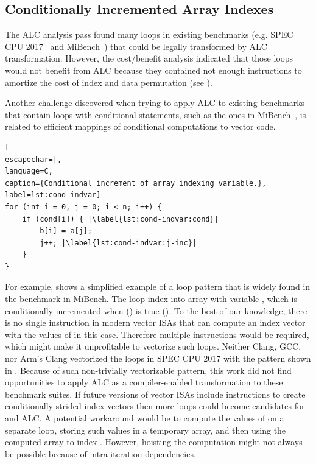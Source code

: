 \subsection{Conditionally Incremented Array Indexes}
\label{sec:eval-limitations}

The ALC analysis pass found many loops in existing benchmarks (e.g. SPEC CPU 2017~\cite{spec} and MiBench~\cite{MiBench}) that could be legally transformed by ALC transformation.
However, the cost/benefit analysis indicated that those loops would not benefit from ALC because they contained not enough instructions to amortize the cost of index and data permutation (see ).

Another challenge discovered when trying to apply ALC to existing benchmarks that contain loops with conditional statements, such as the ones in MiBench~\cite{MiBench}, is related to efficient mappings of conditional computations to vector code. 

\begin{center}
\begin{minipage}[t]{0.99\columnwidth}
\begin{lstlisting}[
escapechar=|,
language=C,
caption={Conditional increment of array indexing variable.},
label=lst:cond-indvar]
for (int i = 0, j = 0; i < n; i++) {
    if (cond[i]) { |\label{lst:cond-indvar:cond}|
        b[i] = a[j];
        j++; |\label{lst:cond-indvar:j-inc}|
    }
}
\end{lstlisting} 
\end{minipage}
\end{center}

For example,  shows a simplified example of a loop pattern that is widely found in the  benchmark in MiBench.
The loop index into array  with variable , which is conditionally incremented when ()  is true ().
To the best of our knowledge, there is no single instruction in modern vector ISAs that can compute an index vector with the values of  in this case.
Therefore multiple instructions would be required, which might make it unprofitable to vectorize such loops.
Neither Clang, GCC, nor Arm's Clang vectorized the loops in SPEC CPU 2017 with the pattern shown in .
Because of such non-trivially vectorizable pattern, this work did not find opportunities to apply ALC as a compiler-enabled transformation to these benchmark suites.
If future versions of vector ISAs include instructions to create conditionally-strided index vectors then more loops could become candidates for \ifconversion and ALC.
A potential workaround would be to compute the values of  on a separate loop, storing such values in a temporary array, and then using the computed array to index .
However, hoisting the computation might not always be possible because of intra-iteration dependencies.

